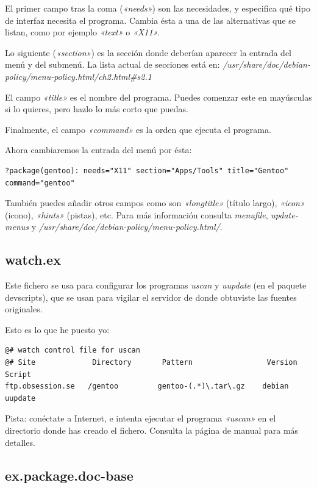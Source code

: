 \documentclass[letterpaper,12pt,spanish]{manual}
\begin{document}
El primer campo tras la coma (\emph{«needs»}) son las necesidades, y especifica qué tipo de interfaz necesita el programa. Cambia ésta a una de las alternativas que se listan, como por ejemplo \emph{«text»} o \emph{«X11»}.

Lo siguiente (\emph{«section»}) es la sección donde deberían aparecer la entrada del menú y del submenú. La lista actual de secciones está en: \emph{/usr/share/doc/debian-policy/menu-policy.html/ch2.html\#s2.1}

El campo \emph{«title»} es el nombre del programa. Puedes comenzar este en mayúsculas si lo quieres, pero hazlo lo más corto que puedas.

Finalmente, el campo \emph{«command»} es la orden que ejecuta el programa.

Ahora cambiaremos la entrada del menú por ésta:

\begin{Verbatim}[commandchars=@\[\]]
?package(gentoo): needs="X11" section="Apps/Tools" title="Gentoo" command="gentoo"
\end{Verbatim}

También puedes añadir otros campos como son \emph{«longtitle»} (título largo), \emph{«icon»} (icono), \emph{«hints»} (pistas), etc. Para más información consulta \emph{menufile}, \emph{update-menus} y \emph{/usr/share/doc/debian-policy/menu-policy.html/}.


\subsection{watch.ex}

Este fichero se usa para configurar los programas \emph{uscan} y \emph{uupdate} (en el paquete devscripts), que se usan para vigilar el servidor de donde obtuviste las fuentes originales.

Esto es lo que he puesto yo:

\begin{Verbatim}[commandchars=@\[\]]
@# watch control file for uscan
@# Site             Directory       Pattern                 Version Script
ftp.obsession.se   /gentoo         gentoo-(.*)\.tar\.gz    debian  uupdate
\end{Verbatim}

Pista: conéctate a Internet, e intenta ejecutar el programa \emph{«uscan»} en el directorio donde has creado el fichero. Consulta la página de manual para más detalles.


\subsection{ex.package.doc-base}
\end{document}
